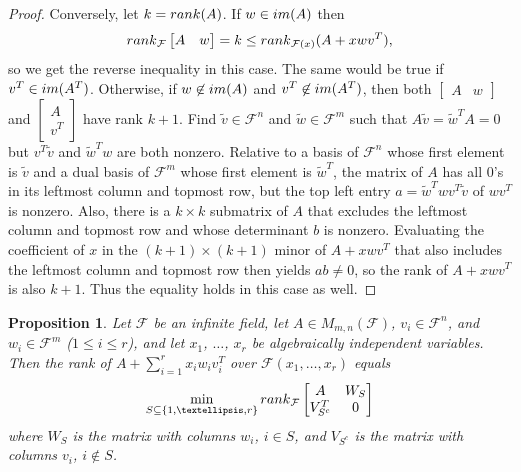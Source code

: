 \documentclass[10pt,a4paper]{amsart}
\newtheorem{prop}[thm]{Proposition}
\begin{document}
\begin{proof}
Conversely, let $k = {\rm rank}(A)$. If $w \in {\rm im}(A)$ then $${\rm rank}_{\mathcal{F}}\left[\begin{matrix} A&w\end{matrix}\right] = k \leq {\rm rank}_{\mathcal{F}(x)}(A + xwv^T),$$ so we get the reverse inequality in this case. The same would be true if $v^T \in {\rm im}(A^T)$. Otherwise, if $w \not\in {\rm im}(A)$ and $v^T \not\in {\rm im}(A^T)$, then both $\left[\begin{matrix} A&w\end{matrix}\right]$ and $\left[\begin{matrix} A\\ v^T\end{matrix}\right]$ have rank $k + 1$. Find $\tilde{v} \in \mathcal{F}^n$ and $\tilde{w} \in \mathcal{F}^m$ such that $A\tilde{v} = \tilde{w}^TA = 0$ but $v^T\tilde{v}$ and $\tilde{w}^Tw$ are both nonzero. Relative to a basis of $\mathcal{F}^n$ whose first element is $\tilde{v}$ and a dual basis of $\mathcal{F}^m$ whose first element is $\tilde{w}^T$, the matrix of $A$ has all $0$'s in its leftmost column and topmost row, but the top left entry $a = \tilde{w}^Twv^T\tilde{v}$ of $wv^T$ is nonzero. Also, there is a $k\times k$ submatrix of $A$ that excludes the leftmost column and topmost row and whose determinant $b$ is nonzero. Evaluating the coefficient of $x$ in the $(k+1)\times(k+1)$ minor of $A + xwv^T$ that also includes the leftmost column and topmost row then yields $ab \neq 0$, so the rank of $A + xwv^T$ is also $k + 1$. Thus the equality holds in this case as well.
\end{proof}

\begin{prop}\label{rankprop}
Let $\mathcal{F}$ be an infinite field, let $A \in M_{m,n}(\mathcal{F})$, $v_i \in \mathcal{F}^n$, and $w_i \in \mathcal{F}^m$ ($1 \leq i \leq r$), and let $x_1$, $\ldots$, $x_r$ be algebraically independent variables. Then the rank of $A + \sum_{i=1}^r x_iw_iv_i^T$ over $\mathcal{F}(x_1, \ldots, x_r)$ equals $$\min_{S \subseteq \{1, \ldots, r\}} {\rm rank}_{\mathcal{F}} \left[\begin{matrix} A&W_S\\ V_{S^c}^T&0\end{matrix}\right]$$ where $W_S$ is the matrix with columns $w_i$, $i \in S$, and $V_{S^c}$ is the matrix with columns $v_i$, $i \not\in S$.
\end{prop}
\end{document}
